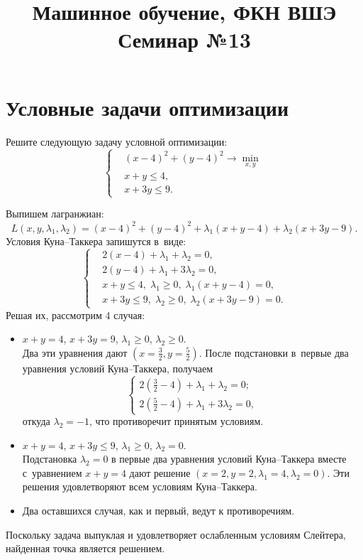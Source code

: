 \documentclass[12pt,fleqn]{article}
\begin{document}
\title{Машинное обучение, ФКН ВШЭ\\Семинар №13}
\author{}
\date{}
\maketitle

\section{Условные задачи оптимизации}

\begin{vkProblem}
	Решите следующую задачу условной оптимизации:
	\[
	\left\{
	\begin{aligned}
	& (x-4)^2 + (y-4)^2 \to \min_{x, y} \\
	& x+y \leq 4, \\
	& x+3y \leq 9.
	\end{aligned}
	\right.
	\]
\end{vkProblem}

\begin{esSolution}
	Выпишем лагранжиан:
	\[
	L(x, y, \lambda_1, \lambda_2)
	=
	(x-4)^2 + (y-4)^2 + \lambda_1(x+y-4) + \lambda_2(x+3y-9).
	\]
	Условия Куна--Таккера запишутся в~виде:
	\[
	\left\{
	\begin{aligned}
	& 2(x-4)+\lambda_1+\lambda_2 = 0, \\
	& 2(y-4)+\lambda_1+3\lambda_2 = 0, \\
	& x+y \leq 4,\; \lambda_1 \geqslant 0,\; \lambda_1(x+y -4)=0, \\
	& x+3y \leq 9,\; \lambda_2 \geqslant 0,\; \lambda_2(x+3y -9)=0.
	\end{aligned}
	\right.
	\]
	Решая их, рассмотрим 4 случая:
	\begin{itemize}
		\item
		$x+y = 4$,\: $x+3y = 9$,\: $\lambda_1\ge0$,\: $\lambda_2\ge0$.\\
		Два эти уравнения дают $(x=\frac32,y=\frac52)$.
		После подстановки в~первые два уравнения условий Куна--Таккера, получаем
		\[
		\begin{cases}
		2(\frac32-4)+\lambda_1+\lambda_2 = 0;\\
		2(\frac52-4)+\lambda_1+3\lambda_2 = 0,
		\end{cases}
		\]
		откуда $\lambda_2 = -1$, что противоречит принятым условиям.
		\item
		$x+y = 4$,\: $x+3y \le 9$,\: $\lambda_1\ge0$,\: $\lambda_2=0$.\\
		Подстановка $\lambda_2=0$ в первые два уравнения условий Куна--Таккера вместе с~уравнением $x+y = 4$ дают решение $(x=2, y=2, \lambda_1 = 4, \lambda_2=0)$.
		Эти решения удовлетворяют всем условиям Куна--Таккера.
		\item
		Два оставшихся случая, как и первый, ведут к противоречиям.
	\end{itemize}
	
	Поскольку задача выпуклая и удовлетворяет ослабленным условиям Слейтера,
	найденная точка является решением.
\end{esSolution}
\end{document}
